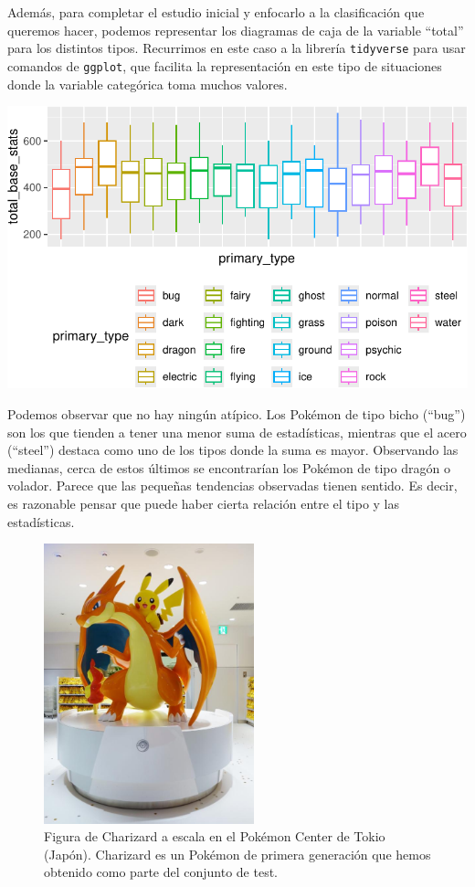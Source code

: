 \documentclass[
  12pt,
]{extreport}
\begin{document}
Además, para completar el estudio inicial y enfocarlo a la clasificación
que queremos hacer, podemos representar los diagramas de caja de la
variable ``total'' para los distintos tipos. Recurrimos en este caso a
la librería \texttt{tidyverse} para usar comandos de \texttt{ggplot},
que facilita la representación en este tipo de situaciones donde la
variable categórica toma muchos valores.

\includegraphics{trabajo_files/figure-pdf/unnamed-chunk-62-1.pdf}

Podemos observar que no hay ningún atípico. Los Pokémon de tipo bicho
(``bug'') son los que tienden a tener una menor suma de estadísticas,
mientras que el acero (``steel'') destaca como uno de los tipos donde la
suma es mayor. Observando las medianas, cerca de estos últimos se
encontrarían los Pokémon de tipo dragón o volador. Parece que las
pequeñas tendencias observadas tienen sentido. Es decir, es razonable
pensar que puede haber cierta relación entre el tipo y las estadísticas.

\begin{figure}[H]

{\centering \includegraphics[width=2.39583in,height=\textheight]{trabajo_images/charizard.jpeg}

}

\caption{Figura de Charizard a escala en el Pokémon Center de Tokio
(Japón). Charizard es un Pokémon de primera generación que hemos
obtenido como parte del conjunto de test.}

\end{figure}%
\end{document}
